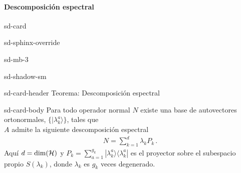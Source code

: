 \documentclass[letterpaper,10pt,english]{jupyterBook}
\newcommand{\ket}[1]{|#1\rangle}
\newcommand{\ketbra}[2]{| #1\rangle \langle #2 |}
\newcommand{\Hil}{{\cal H}}
\begin{document}
\paragraph{Descomposición  espectral}
\label{\detokenize{docs/Part_01_Formalismo/Chapter_01_02_Formalismo_matem_xe1tico/01_03_Operadores_myst:descomposicion-espectral}}
\begin{sphinxuseclass}{sd-card}
\begin{sphinxuseclass}{sd-sphinx-override}
\begin{sphinxuseclass}{sd-mb-3}
\begin{sphinxuseclass}{sd-shadow-sm}
\begin{sphinxuseclass}{sd-card-header}
\sphinxAtStartPar
Teorema: Descomposición espectral

\end{sphinxuseclass}
\begin{sphinxuseclass}{sd-card-body}
\sphinxAtStartPar
Para todo operador normal \(N\) existe una base de  autovectores ortonormales,  \(\{\ket{\lambda^a_k}\}\),  tales que\\
\(A\) admite la siguiente  descomposición espectral 
\begin{equation*}
\begin{split}
N = \sum_{k=1}^d \lambda_k   P_k\, .
\end{split}
\end{equation*}
\sphinxAtStartPar
Aquí \(d=  {\rm dim}(\Hil)\) y \(P_k = \sum_{a=1}^{g_k} \ketbra{\lambda^a_k}{\lambda^a_k}\) es el proyector sobre el subespacio propio \(S(\lambda_k)\), donde \(\lambda_k\) es \(g_k\) veces degenerado.

\end{sphinxuseclass}
\end{sphinxuseclass}
\end{sphinxuseclass}
\end{sphinxuseclass}
\end{sphinxuseclass}
\end{document}
